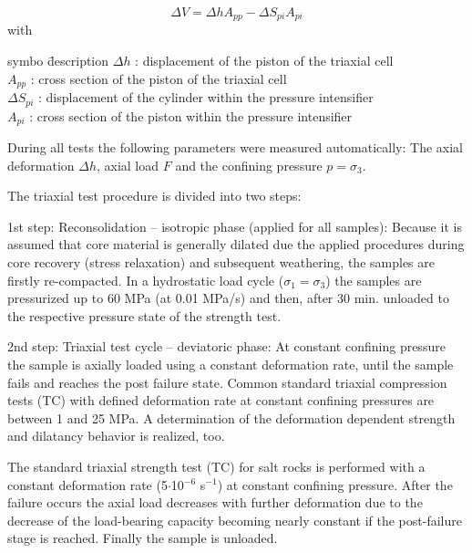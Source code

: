 \begin{equation}
\Delta V = \Delta h A_{pp} -\Delta S_{pi} A_{pi}
\end{equation}
with
\begin{tabbing}
symbo \= description \kill
$\Delta h$ : \> displacement of the piston of the triaxial cell \\
$A_{pp}$ : \> cross section of the piston of the triaxial cell \\
$\Delta S_{pi}$ : \> displacement of the cylinder within the pressure intensifier \\
$A_{pi}$ : \> cross section of the piston within the pressure intensifier \\
\end{tabbing}

During all tests the following parameters were measured automatically: The axial deformation $\Delta h$, axial load $F$ and the confining pressure $p = \sigma_3$. 

The triaxial test procedure is divided into two steps:

\begin{list}{-}{\leftmargin=1em \itemindent=0em \itemsep=0.2em}
\item 1st step: Reconsolidation – isotropic phase (applied for all samples): Because it is assumed that core material is generally dilated due the applied procedures during core recovery (stress relaxation) and subsequent weathering, the samples are firstly re-compacted. In a hydrostatic load cycle ($\sigma_1 = \sigma_3$) the samples are pressurized up to 60 MPa (at 0.01 MPa/s) and then, after 30 min. unloaded to the respective pressure state of the strength test.
\item 2nd step: Triaxial test cycle – deviatoric phase:  At constant confining pressure the sample is axially loaded using a constant deformation rate, until the sample fails and reaches the post failure state. Common standard triaxial compression tests (TC) with defined deformation rate at constant confining pressures are between 1 and 25 MPa. A determination of the deformation dependent strength and dilatancy behavior is realized, too.
\end{list}

The standard triaxial strength test (TC) for salt rocks is performed with a constant deformation rate 
(5$\cdot$10$^{-6}$ s$^{-1}$) at constant confining pressure. After the failure occurs the axial load decreases with further deformation due to the decrease of the load-bearing capacity becoming nearly constant if the post-failure stage is reached. Finally the sample is unloaded.

